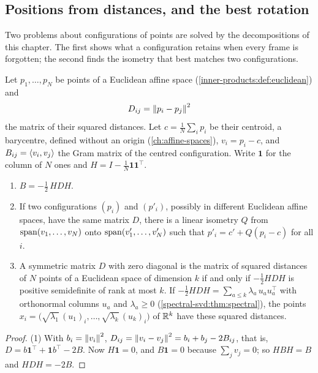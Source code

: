 \begin{notechapter}
\section{Positions from distances, and the best rotation}
\label{spectral-svd:sec:distances}

Two problems about configurations of points are solved by the
decompositions of this chapter. The first shows what a configuration
retains when every frame is forgotten; the second finds the isometry
that best matches two configurations.

Let $p_1,\dots,p_N$ be points of a Euclidean affine space
(\cref{inner-products:def:euclidean}) and
\[
  D_{ij} = \left\|p_i - p_j\right\|^2
\]
the matrix of their squared distances. Let
$c = \frac1N\sum_ip_i$ be their centroid, a barycentre, defined without
an origin (\cref{ch:affine-spaces}), $v_i = p_i - c$, and
$B_{ij} = \left\langle v_i, v_j \right\rangle$ the Gram matrix of the centred
configuration. Write $\mathbf 1$ for the column of $N$ ones and
$H = I - \frac1N\mathbf 1\mathbf 1^\top$.

\begin{proposition}
\label{spectral-svd:prop:distances}
\begin{enumerate}[nosep]
  \item $B = -\frac12\,HDH$.
  \item If two configurations $(p_i)$ and $(p'_i)$, possibly in
        different Euclidean affine spaces, have the same matrix $D$,
        there is a linear isometry $Q$ from
        $\operatorname{span}(v_1,\dots,v_N)$ onto $\operatorname{span}(v'_1,\dots,v'_N)$ such that
        $p'_i = c' + Q(p_i - c)$ for all $i$.
  \item A symmetric matrix $D$ with zero diagonal is the matrix of
        squared distances of $N$ points of a Euclidean space of
        dimension $k$ if and only if $-\frac12HDH$ is positive
        semidefinite of rank at most $k$. If
        $-\frac12HDH = \sum_{a\leq k}\lambda_a\,u_au_a^\top$ with
        orthonormal columns $u_a$ and $\lambda_a\geq0$
        (\cref{spectral-svd:thm:spectral}), the points
        $x_i = \bigl(\sqrt{\lambda_1}\,(u_1)_i,\dots,
        \sqrt{\lambda_k}\,(u_k)_i\bigr)$ of $\mathbb{R}^k$ have these squared
        distances.
\end{enumerate}
\end{proposition}

\begin{proof}
(1) With $b_i = \left\|v_i\right\|^2$,
$D_{ij} = \left\|v_i - v_j\right\|^2 = b_i + b_j - 2B_{ij}$, that is,
$D = b\mathbf 1^\top + \mathbf 1b^\top - 2B$. Now $H\mathbf 1 = 0$, and
$B\mathbf 1 = 0$ because $\sum_jv_j = 0$; so $HBH = B$ and
$HDH = -2B$.


\end{proof}
\end{notechapter}
